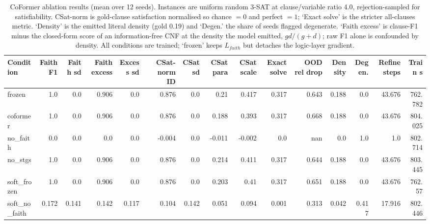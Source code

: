 \begin{table}[t]
\centering
\caption{CoFormer ablation results (mean over 12 seeds). Instances are uniform random 3-SAT at clause/variable ratio 4.0, rejection-sampled for satisfiability. CSat-norm is gold-clause satisfaction normalised so chance $=0$ and perfect $=1$; `Exact solve' is the stricter all-clauses metric. `Density' is the emitted literal density (gold 0.19) and `Degen.' the share of seeds flagged degenerate. `Faith excess' is clause-F1 minus the closed-form score of an information-free CNF at the density the model emitted, $g d/(g+d)$; raw F1 alone is confounded by density. All conditions are trained; `frozen' keeps $L_{faith}$ but detaches the logic-layer gradient.}
\label{tab:coformer}
\begin{tabular}{lrrrrrrrrrrrrrr}
\hline
Condition & Faith F1 & Faith sd & Faith excess & Excess sd & CSat-norm ID & CSat sd & CSat para & CSat scale & Exact solve & OOD rel drop & Density & Degen. & Refine steps & Train s \\
\hline
frozen & 1.0 & 0.0 & 0.906 & 0.0 & 0.876 & 0.0 & 0.21 & 0.417 & 0.317 & 0.643 & 0.188 & 0.0 & 43.676 & 762.782 \\
coformer & 1.0 & 0.0 & 0.906 & 0.0 & 0.876 & 0.0 & 0.188 & 0.393 & 0.317 & 0.668 & 0.188 & 0.0 & 43.676 & 804.025 \\
no\_faith & 0.0 & 0.0 & 0.0 & 0.0 & -0.004 & 0.0 & -0.011 & -0.002 & 0.0 & nan & 0.0 & 1.0 & 1.0 & 802.714 \\
no\_stgs & 1.0 & 0.0 & 0.906 & 0.0 & 0.876 & 0.0 & 0.214 & 0.411 & 0.317 & 0.644 & 0.188 & 0.0 & 43.676 & 803.445 \\
soft\_frozen & 1.0 & 0.0 & 0.906 & 0.0 & 0.876 & 0.0 & 0.203 & 0.41 & 0.317 & 0.651 & 0.188 & 0.0 & 43.676 & 762.57 \\
soft\_no\_faith & 0.172 & 0.141 & 0.142 & 0.117 & 0.104 & 0.142 & 0.051 & 0.094 & 0.001 & 0.313 & 0.042 & 0.417 & 17.916 & 802.446 \\
\hline
\end{tabular}
\end{table}